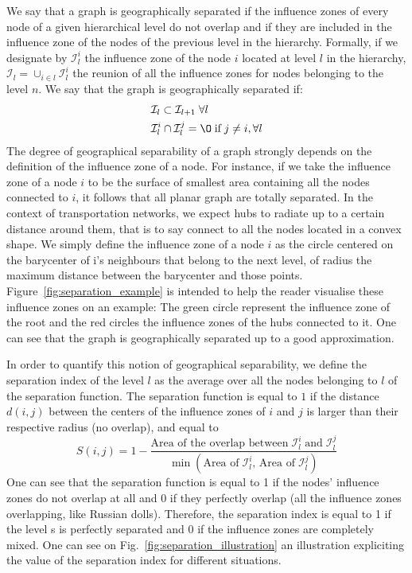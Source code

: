 \begin{materials}
We say that a graph is geographically separated if the influence zones of every node of a given hierarchical level do not overlap and if they are included in the influence zone of the nodes of the previous level in the hierarchy. Formally, if we designate by $\mathcal{I}^i_l$ the influence zone of the node $i$ located at level $l$ in the hierarchy, $\mathcal{I}_l = \cup_{i \in l} \mathcal{I}^i_l$ the reunion of all the influence zones for nodes belonging to the level $n$. We say that the graph is geographically separated if:
\begin{align}
&\mathcal{I}_l \subset \mathcal{I}_{l+1} \; \forall l\\
&\mathcal{I}^i_l \cap \mathcal{I}^j_l = \O \; \text{if} \; j \neq i, \forall l
\end{align}
The degree of geographical separability of a graph strongly depends on the definition of the influence zone of a node. For instance, if we take the influence zone of a node $i$ to be the surface of smallest area containing all the nodes connected to $i$, it follows that all planar graph are totally separated. 
In the context of transportation networks, we expect hubs to radiate up to a certain distance around them, that is to say connect to all the nodes located in a convex shape. We simply define the influence zone of a node $i$ as the circle centered on the barycenter of i's neighbours that belong to the next level, of radius the maximum distance between the barycenter and those points. 
%
Figure~\ref{fig:separation_example} is intended to help the reader visualise these influence zones on an example: The green circle represent the influence zone of the root and the red circles the influence zones of the hubs connected to it. One can see that the graph is geographically separated up to a good approximation.


In order to quantify this notion of geographical separability, we define the separation index of the level $l$ as the average over all the nodes belonging to $l$ of the separation function. The separation function is equal to $1$ if the distance $d(i,j)$ between the centers of the influence zones of $i$ and $j$ is larger than their respective radius (no overlap), and equal to 
\begin{equation}
S(i,j) = 1-\frac{\text{Area of the overlap between} \; \mathcal{I}_l^i \; \text{and} \; \mathcal{I}_l^j}{\min \left(\text{Area of} \; \mathcal{I}_l^i\text{, Area of} \; \mathcal{I}_l^j\right)}
\end{equation}
One can see that the separation function is equal to 1 if the nodes' influence zones do not overlap at all and 0 if they perfectly overlap (all the influence zones overlapping, like Russian dolls). Therefore, the separation index is equal to 1 if the level s is perfectly separated and 0 if the influence zones are completely mixed. One can see on Fig.~\ref{fig:separation_illustration} an illustration expliciting the value of the separation index for different situations.

\end{materials}
